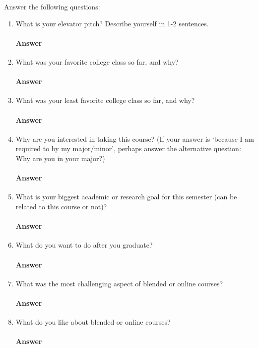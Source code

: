 \documentclass{article}
\begin{document}
Answer the following questions:
\begin{enumerate}
    \item What is your elevator pitch?  Describe yourself in 1-2
        sentences.
        \paragraph{Answer} 

    \item What was your favorite college class so far, and why?
        \paragraph{Answer} 

    \item What was your least favorite college class so far, and why?
        \paragraph{Answer} 

    \item Why are you interested in taking this course? (If your answer is
        `because I am required to by my major/minor', perhaps answer the
        alternative question: Why are you in your major?)
        \paragraph{Answer} 

    \item What is your biggest academic or research goal for this semester (can
        be related to this course or not)?
        \paragraph{Answer} 

    \item What do you want to do after you graduate?
        \paragraph{Answer} 

    \item What was the most challenging aspect of blended or online courses?
        \paragraph{Answer} 

    \item What do you like about blended or online courses?
        \paragraph{Answer} 

\end{enumerate}
\end{document}
